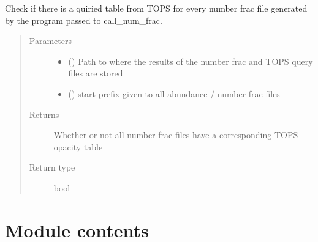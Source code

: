 \documentclass[letterpaper,10pt,english]{sphinxmanual}
\begin{document}
\begin{fulllineitems}
\label{\detokenize{pyTOPSScrape.api:pyTOPSScrape.api.utils.validate_extant_tables}}
\sphinxAtStartPar
Check if there is a quiried table from TOPS for every number frac file
generated by the program passed to call\_num\_frac.
\begin{quote}\begin{description}
\item[{Parameters}] \leavevmode\begin{itemize}
\item {} 
\sphinxAtStartPar
{} () \textendash{} Path to where the results of the number frac and TOPS query files
are stored

\item {} 
\sphinxAtStartPar
{} () \textendash{} start prefix given to all abundance / number frac files

\end{itemize}

\item[{Returns}] \leavevmode
\sphinxAtStartPar
{} \textendash{} Whether or not all number frac files have a corresponding TOPS
opacity table

\item[{Return type}] \leavevmode
\sphinxAtStartPar
bool

\end{description}\end{quote}

\end{fulllineitems}



\section{Module contents}
\label{\detokenize{pyTOPSScrape.api:module-pyTOPSScrape.api}}\label{\detokenize{pyTOPSScrape.api:module-contents}}
\end{document}
